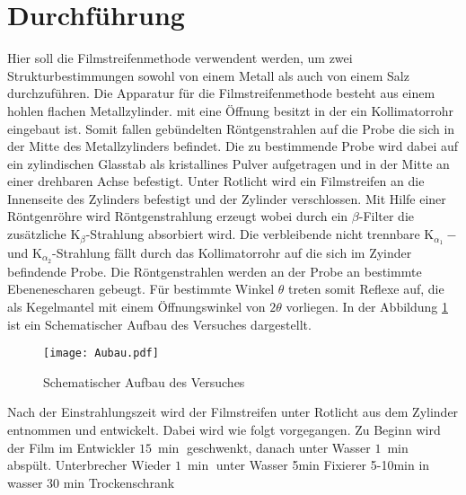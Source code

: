 \section{Durchführung}
\label{sec:Durchführung}
Hier soll die Filmstreifenmethode verwendent werden,
um zwei Strukturbestimmungen
sowohl von einem Metall als auch von
einem Salz durchzuführen.
Die Apparatur für die Filmstreifenmethode besteht aus einem hohlen flachen Metallzylinder.
mit eine Öffnung besitzt in der ein Kollimatorrohr eingebaut ist.
Somit fallen gebündelten Röntgenstrahlen auf die Probe die sich in
der Mitte des Metallzylinders befindet.
Die zu bestimmende Probe wird dabei auf ein zylindischen Glasstab
als kristallines Pulver aufgetragen und in der Mitte an einer drehbaren
Achse befestigt. Unter Rotlicht wird ein Filmstreifen an die Innenseite
des Zylinders befestigt und der Zylinder verschlossen.
Mit Hilfe einer Röntgenröhre wird Röntgenstrahlung erzeugt
wobei durch ein $\beta$-Filter die zusätzliche
$\mathrm{K}_\beta$-Strahlung absorbiert wird.
Die verbleibende nicht trennbare  $\mathrm{K}_{\alpha_1}-$
und $\mathrm{K}_{\alpha_2}$-Strahlung fällt durch das Kollimatorrohr
auf die sich im Zyinder befindende Probe. Die Röntgenstrahlen werden an
der Probe an bestimmte Ebenenescharen gebeugt. Für bestimmte Winkel $\theta$ treten
somit Reflexe auf, die als Kegelmantel mit einem Öffnungswinkel von $2\theta$
vorliegen. In der Abbildung \ref{fig:aufbau} ist ein Schematischer Aufbau des Versuches dargestellt.
\begin{figure}
  \centering
  \texttt{[image: Aubau.pdf]}
  \caption{Schematischer Aufbau des Versuches  }
  \label{fig:aufbau}
 \end{figure}
Nach der Einstrahlungszeit wird der Filmstreifen unter Rotlicht
aus dem Zylinder entnommen und entwickelt.
Dabei wird wie folgt vorgegangen.
Zu Beginn wird der Film im Entwickler $\SI{15}{\min}$ geschwenkt,
danach unter Wasser $\SI{1}{\min}$ abspült.
Unterbrecher
Wieder $\SI{1}{\min}$ unter Wasser
5min Fixierer
5-10min in wasser
30 min Trockenschrank


